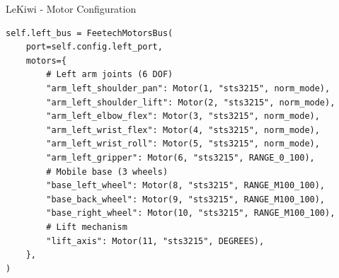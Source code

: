 \begin{frame}[fragile]{LeKiwi - Motor Configuration}
\begin{lstlisting}[basicstyle=\ttfamily\scriptsize]
self.left_bus = FeetechMotorsBus(
    port=self.config.left_port,
    motors={
        # Left arm joints (6 DOF)
        "arm_left_shoulder_pan": Motor(1, "sts3215", norm_mode),
        "arm_left_shoulder_lift": Motor(2, "sts3215", norm_mode),
        "arm_left_elbow_flex": Motor(3, "sts3215", norm_mode),
        "arm_left_wrist_flex": Motor(4, "sts3215", norm_mode),
        "arm_left_wrist_roll": Motor(5, "sts3215", norm_mode),
        "arm_left_gripper": Motor(6, "sts3215", RANGE_0_100),
        # Mobile base (3 wheels)
        "base_left_wheel": Motor(8, "sts3215", RANGE_M100_100),
        "base_back_wheel": Motor(9, "sts3215", RANGE_M100_100),
        "base_right_wheel": Motor(10, "sts3215", RANGE_M100_100),
        # Lift mechanism
        "lift_axis": Motor(11, "sts3215", DEGREES),
    },
)
\end{lstlisting}
\end{frame}


